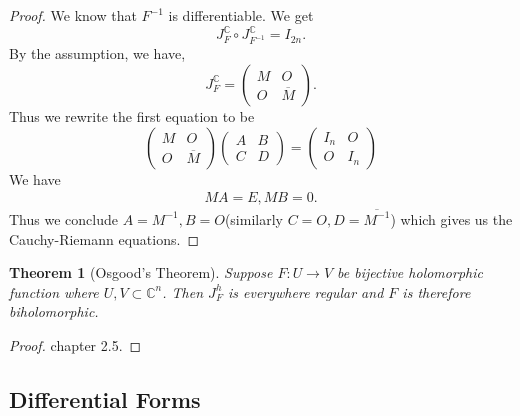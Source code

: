 \documentclass{article}
\newtheorem{theorem}{Theorem} [section]
\newcommand{\C}[0]{\mathbb{C}}
\begin{document}
\begin{proof}
  We know that $F^{-1}$ is differentiable. We get 
  \begin{equation*}
    J_F^\C\circ J_{F^{-1}}^\C = I_{2n}.
  \end{equation*}
  By the assumption, we have,
  \begin{equation*}
    J_F^\C = \begin{pmatrix}
      M & O\\
      O & \overline{M}
    \end{pmatrix}.
  \end{equation*}
  Thus we rewrite the first equation to be 
  \begin{equation*}
      \begin{pmatrix}
      M & O\\
      O & \overline{M}
    \end{pmatrix}
    \begin{pmatrix}
      A & B\\
      C & D
    \end{pmatrix}
    =\begin{pmatrix}
      I_n & O\\
      O & I_{n}
    \end{pmatrix}
  \end{equation*}
  We have 
  \begin{align*}
    MA = E, MB = 0.
  \end{align*}
  Thus we conclude $A = M^{-1},B=O$(similarly $C=O,D=\overline{M^{-1}}$) which gives us the Cauchy-Riemann equations.
\end{proof}

\begin{theorem}[Osgood's Theorem]
Suppose $F:U\to V$ be bijective holomorphic function where $U,V\subset\C^n$. Then $J_F^h$ is everywhere regular and $F$ is therefore biholomorphic.
\end{theorem}

\begin{proof}
\cite{Ra} chapter 2.5.
\end{proof}

\subsection{Differential Forms}
\end{document}
